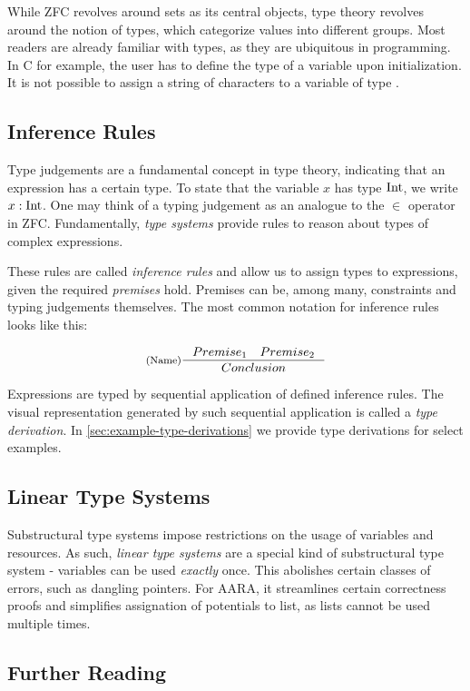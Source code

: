 While ZFC revolves around sets as its central objects, type theory revolves around the notion of types, which categorize values into different groups. Most readers are already familiar with types, as they are ubiquitous in programming. In C for example, the user has to define the type of a variable upon initialization. It is not possible to assign a string of characters to a variable of type \typeint.

\subsection{Inference Rules}

Type judgements are a fundamental concept in type theory, indicating that an expression has a certain type. To state that the variable \(x\) has type \(\text{Int}\), we write \(x : \text{Int}\). One may think of a typing judgement as an analogue to the \(\in\) operator in ZFC. Fundamentally, \emph{type systems} provide rules to reason about types of complex expressions.

These rules are called \emph{inference rules} and allow us to assign types to expressions, given the required \emph{premises} hold. Premises can be, among many, constraints and typing judgements themselves. The most common notation for inference rules looks like this: 

\[
   \inference[(Name)]
   {Premise_1 \quad Premise_2}
   {Conclusion}
\]

Expressions are typed by sequential application of defined inference rules. The visual representation generated by such sequential application is called a \emph{type derivation}. In \cref{sec:example-type-derivations} we provide type derivations for select examples.

\subsection{Linear Type Systems}

Substructural type systems impose restrictions on the usage of variables and resources. As such, \emph{linear type systems} are a special kind of substructural type system - variables can be used \emph{exactly} once. This abolishes certain classes of errors, such as dangling pointers. For AARA, it streamlines certain correctness proofs and simplifies assignation of potentials to list, as lists cannot be used multiple times.

\subsection{Further Reading}

